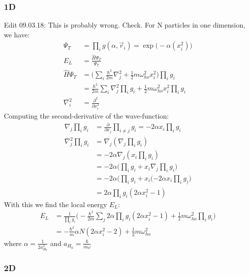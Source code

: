 \documentclass[12pt]{article}
\newcommand{\f}[2]{\frac{#1}{#2}}
\newcommand{\op}[1]{\widehat{#1}}
\newcommand{\pp}[1]{\frac{\partial}{\partial #1}}
\newcommand{\ppn}[1]{\frac{\partial^2}{\partial #1^2}}
\begin{document}
\subsubsection{1D}
Edit 09.03.18: This is probably wrong. Check.
For N particles in one dimension, we have:
\begin{align*}
	\Psi_T &= \prod_{i} g(\alpha, \vec{r}_i) = \exp\big(-\alpha(x^{2}_i)\big) \\
	E_L &= \f{\op{H}\Psi_T}{\Psi_T} \\
	\op{H}\Psi_T &= \big(\sum_{i} \f{\hbar^2}{2m}\nabla^{2}_j + 
	\f{1}{2}m\omega^{2}_{ho}x^{2}_i \big) \prod_{i} g_i \\
	&= \f{\hbar^2}{2m}\sum_{i} \nabla^{2}_j \prod_{i} g_i + 
	\f{1}{2}m\omega^{2}_{ho}x^{2}_i \prod_{i} g_i \\
	\nabla^{2}_i &= \ppn{x_i}
\end{align*}
Computing the second-derivative of the wave-function:
\begin{align*}
	\nabla_j \prod_{i}g_i &=\pp{x_j}\prod_{i\neq j}g_i = -2\alpha x_i\prod_{i} g_i \\
	\nabla^{2}_j\prod_{i}g_i &= \nabla_j(\nabla_j \prod_{i}g_i) \\
	&= -2\alpha \nabla_j(x_i\prod_{i} g_i) \\
	&= -2\alpha \big(\prod_{i}g_i + x_i\nabla_j\prod_{i}g_i \big) \\
	&= -2\alpha \big(\prod_{i}g_i + x_i(-2\alpha x_i \prod_{i}g_)\big) \\
	&= 2\alpha\prod_{i}g_i(2\alpha x^{2}_i - 1)
\end{align*}
With this we find the local energy $E_L$:
\begin{align*}
	E_L &= 
	\f{1}{\prod_{i}g_i}\big(-\f{\hbar^2}{2m}\sum_{j}2\alpha\prod_{i}g_i
	(2\alpha x^{2}_i - 1) + \f{1}{2}m\omega^{2}_{ho}\prod_{i}g_i \big) \\
	&= -\f{\hbar^2}{m}\alpha N(2\alpha x^{2}_i - 2) + \f{1}{2}m\omega^{2}_{ho}
\end{align*}
where $\alpha = \f{1}{2a^{2}_{H_0}}$ and $a_{H_0} = \f{\hbar}{m\omega}$

\subsubsection{2D}
\end{document}
